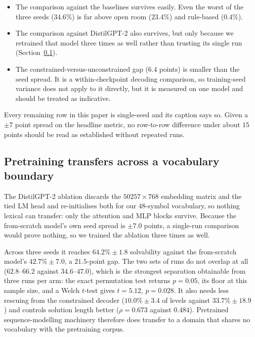 \documentclass[conference]{IEEEtran}
\begin{document}
\begin{itemize}
\item The comparison against the baselines survives easily. Even the worst of
      the three seeds ($34.6\%$) is far above open room ($23.4\%$) and
      rule-based ($0.4\%$).
\item The comparison against DistilGPT-2 also survives, but only because we
      retrained that model three times as well rather than trusting its single
      run (Section~\ref{sec:pretrain}).
\item The constrained-versus-unconstrained gap ($6.4$ points) is smaller than
      the seed spread. It is a within-checkpoint decoding comparison, so
      training-seed variance does not apply to it directly, but it is measured
      on one model and should be treated as indicative.
\end{itemize}

Every remaining row in this paper is single-seed and its caption says so. Given
a $\pm 7$ point spread on the headline metric, no row-to-row difference under
about $15$ points should be read as established without repeated runs.

\subsection{Pretraining transfers across a vocabulary boundary}
\label{sec:pretrain}
The DistilGPT-2 ablation discards the $50257 \times 768$ embedding matrix and
the tied LM head and re-initialises both for our $48$-symbol vocabulary, so
nothing lexical can transfer: only the attention and MLP blocks survive.
Because the from-scratch model's own seed spread is $\pm 7.0$ points, a
single-run comparison would prove nothing, so we trained the ablation three
times as well.

Across three seeds it reaches $\mathbf{64.2\% \pm 1.8}$ solvability against the
from-scratch model's $42.7\% \pm 7.0$, a $21.5$-point gap. The two sets of
runs do not overlap at all ($62.8$--$66.2$ against $34.6$--$47.0$), which is the
strongest separation obtainable from three runs per arm: the exact permutation
test returns $p = 0.05$, its floor at this sample size, and a Welch $t$-test
gives $t = 5.12$, $p = 0.028$. It also needs less rescuing from the constrained
decoder ($10.0\% \pm 3.4$ of levels against $33.7\% \pm 18.9$) and controls
solution length better ($\rho = 0.673$ against $0.484$). Pretrained
sequence-modelling machinery therefore does transfer to a domain that shares no
vocabulary with the pretraining corpus.
\end{document}
